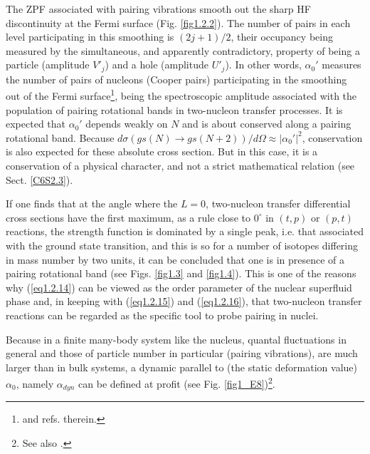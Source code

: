 The ZPF associated with pairing vibrations  smooth out the sharp HF discontinuity at the Fermi surface (Fig. \ref{fig1.2.2}). The number of pairs 
 in each level participating in this smoothing is $(2j+1)/2$, their occupancy being measured by the simultaneous, and apparently contradictory, property of being a particle (amplitude $V'_j$) and a hole (amplitude $U'_j$). In other words, $\alpha_0'$ measures the number of pairs of nucleons (Cooper pairs) participating in the smoothing out of the Fermi surface\footnote{\cite{Schrieffer:64,Potel:17} and refs. therein.}, being  the spectroscopic amplitude associated with the population of pairing rotational bands in two-nucleon transfer processes. It is expected that $\alpha_0'$ depends weakly on $N$ and is about conserved along a pairing rotational band. Because $d\sigma(gs(N)\rightarrow gs(N+2))/d\Omega\approx|\alpha_0'|^2$, conservation is also expected for these absolute cross section. But in this case, it is a conservation of a physical character, and not a strict mathematical relation (see Sect. \ref{C6S2.3}). 


If one finds that at the angle where the $L=0$, two-nucleon transfer differential cross sections have the first maximum, as a rule close to $0^\circ$ in $(t,p)$ or $(p,t)$ reactions, the strength function  is  dominated by a single peak, i.e. that associated with the ground state transition, and this is so for a number of isotopes differing in mass number by two units, it can be concluded that one is in presence of a pairing rotational band (see Figs. \ref{fig1.3} and \ref{fig1.4}). This is one of the reasons why (\ref{eq1.2.14}) can be viewed as the order parameter of the nuclear superfluid phase and, in keeping with (\ref{eq1.2.15}) and (\ref{eq1.2.16}), that two-nucleon transfer reactions can be regarded as the specific tool to probe pairing in nuclei.

Because in a finite many-body system like the nucleus, quantal fluctuations in general and those of particle number in particular (pairing vibrations), are much larger than in bulk systems, a dynamic parallel to (the static deformation value) $\alpha_0$, namely $\alpha_{dyn}$ can be defined at profit (see Fig. \ref{fig1_E8})\footnote{See also \cite{Potel:17}.}. 
